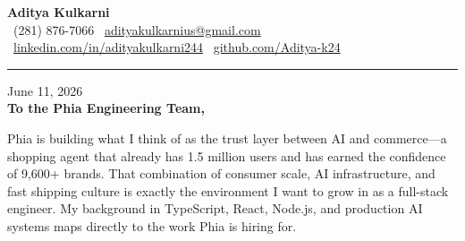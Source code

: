 \documentclass[11pt,letterpaper]{article}
\begin{document}
\begin{center}
    {\Huge \textbf{\color{PhiaPurple} Aditya Kulkarni}}\\[8pt]
    {\color{DarkGrey} \small
    \faPhone \ (281) 876-7066 \quad \textbar \quad
    \faEnvelope \ \href{mailto:adityakulkarnius@gmail.com}{adityakulkarnius@gmail.com} \\[4pt]
    \faLinkedin \ \href{https://linkedin.com/in/adityakulkarni244}{linkedin.com/in/adityakulkarni244} \quad \textbar \quad
    \faGithub \ \href{https://github.com/Aditya-k24}{github.com/Aditya-k24}
    }
\end{center}

\vspace{-4pt}
{\color{PhiaPurple}\rule{\linewidth}{1.5pt}}
\vspace{10pt}

June 11, 2026\\[10pt]
\textbf{To the Phia Engineering Team,}

\vspace{6pt}

Phia is building what I think of as the trust layer between AI and commerce---a shopping agent that already has 1.5 million users and has earned the confidence of 9,600+ brands. That combination of consumer scale, AI infrastructure, and fast shipping culture is exactly the environment I want to grow in as a full-stack engineer. My background in TypeScript, React, Node.js, and production AI systems maps directly to the work Phia is hiring for.

\vspace{4pt}
\end{document}
